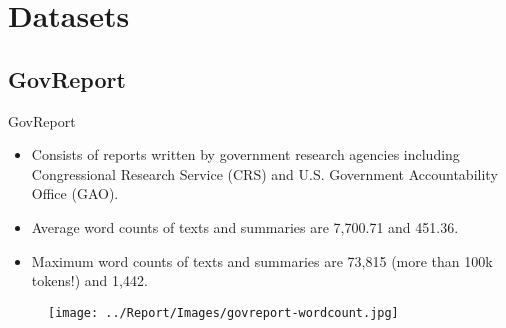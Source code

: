 \section{Datasets}


\subsection{GovReport}

\begin{frame}{GovReport}

	\begin{itemize}
		\item Consists of reports written by government research agencies
		including Congressional Research Service (CRS) and U.S. Government
		Accountability Office (GAO).
		\item<2-> Average word counts of texts and summaries are 7,700.71
		and 451.36.
		\item<3-> Maximum word counts of texts and summaries are 73,815
		(more than 100k tokens!) and 1,442.
	\end{itemize}

	\begin{figure}
		\centering
		\texttt{[image: ../Report/Images/govreport-wordcount.jpg]}
	\end{figure}
	
\end{frame}
